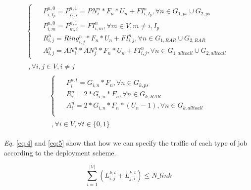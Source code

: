 \documentclass[conference]{IEEEtran}
\begin{document}
\begin{equation}\label{eq:4}
	\begin{split}
		\begin{cases}
			\begin{aligned}
				& P_{i,I_p}^{n,0} = P_{I_p,i}^{n,1} = PN_i^n * F_n * U_n + FI_{i,I_p}^{n}, \forall n \in G_{1,ps}\cup G_{2,ps}\\
				& P_{i,m}^{n,0} = P_{m,i}^{n,1} = FI_{i,m}^{n},\forall m \in V ,m\neq i, I_p\\
				& R_{i,j}^{n} = Ring_{i,j}^n * F_n * U_n + FI_{i,j}^{n}, \forall n \in G_{1,RAR}\cup G_{2,RAR}\\
				& A_{i,j}^n = AN_i^n * AN_j^n * F_n * U_n + FI_{i,j}^{n}, \forall n \in G_{1,alltoall}\cup G_{2,alltoall}
			\end{aligned}
		\end{cases}\\
		\begin{aligned}
			,\forall i,j\in V,i\neq j \qquad
		\end{aligned}
	\end{split}
\end{equation}
\begin{equation}\label{eq:5}
	\begin{split}
		\begin{cases}
			\begin{aligned}
				& P_{i}^{n,t} = G_{i,n} * F_{n}, \forall n\in G_{k,ps}\\
				& R_{i}^{n} = 2 * G_{i,n} * F_{n}, \forall n\in G_{k,RAR}\\
				& A_{i}^{n} = 2 * G_{i,n} * F_{n} * (U_{n} - 1), \forall n\in G_{k,alltoall}\\
			\end{aligned}
		\end{cases}\\
		\begin{aligned}
			,\forall i\in V,\forall t\in\{0,1\}
		\end{aligned}
	\end{split}
\end{equation}

\emph{Eq.} \eqref{eq:4} and \eqref{eq:5} show that how we can specify the traffic of each type of job according to the deployment scheme.

\begin{equation}\label{eq:6}
	\sum_{i=1}^{|V|}(L_{i,j}^{k,t} + L_{j,i}^{k,t}) \leq N\_link
\end{equation}
\end{document}
